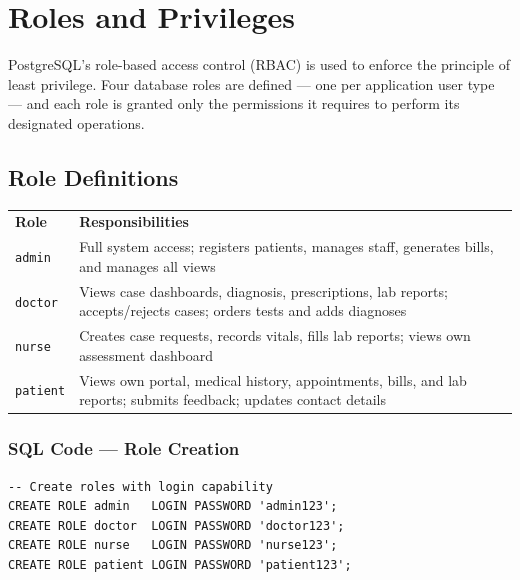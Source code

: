 \documentclass{article}
\newcommand{\theadcell}{\color{white}\bfseries}
\begin{document}
 \newpage
\section{Roles and Privileges}
 
PostgreSQL's role-based access control (RBAC) is used to enforce the principle of least privilege. Four database roles are defined — one per application user type — and each role is granted only the permissions it requires to perform its designated operations.
 
\subsection{Role Definitions}
 
\begin{center}
\renewcommand{\arraystretch}{1.5}
\begin{tabular}{L{3cm} L{9.5cm}}
 \theadcell Role & \theadcell Responsibilities \\
 \texttt{admin}   & Full system access; registers patients, manages staff, generates bills, and manages all views \\
 \texttt{doctor}  & Views case dashboards, diagnosis, prescriptions, lab reports; accepts/rejects cases; orders tests and adds diagnoses \\
 \texttt{nurse}   & Creates case requests, records vitals, fills lab reports; views own assessment dashboard \\
 \texttt{patient} & Views own portal, medical history, appointments, bills, and lab reports; submits feedback; updates contact details \\
\end{tabular}
\end{center}
 
\subsubsection{SQL Code --- Role Creation}
 
\begin{lstlisting}
-- Create roles with login capability
CREATE ROLE admin   LOGIN PASSWORD 'admin123';
CREATE ROLE doctor  LOGIN PASSWORD 'doctor123';
CREATE ROLE nurse   LOGIN PASSWORD 'nurse123';
CREATE ROLE patient LOGIN PASSWORD 'patient123';
\end{lstlisting}
 
\end{document}

